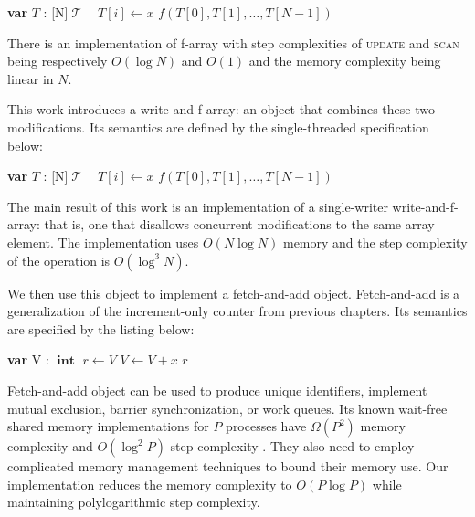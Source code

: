 \documentclass[a4paper,11pt]{article}
\def\T{\ensuremath{\operatorname{\mathcal{T}}}\text{ }}
\def\int{\ensuremath{\operatorname{\textbf{int}}}}
\newcommand{\fn}[1]{\textsc{#1}}
\newcommand{\var}[2]{\textbf{var }#1 : #2}
\newcommand{\arrayspec}[1]{\text{array}[#1]\text{ of }}
\begin{document}
\begin{algorithmic}[1]
	\State\var{$T$}{\arrayspec{N}$\T$}
	\State $T[i] \gets x$
\EndFunction
{}
	\State\Return $f(T[0], T[1], \ldots, T[N-1])$
\EndFunction
\end{algorithmic}

There is an implementation of f-array with step complexities of \fn{update} and \fn{scan} being respectively $O(\log N)$ and $O(1)$ and the memory complexity
being linear in $N$.

This work introduces a write-and-f-array: an object that combines these two modifications. Its semantics are defined by the single-threaded specification below:

\begin{algorithmic}[1]
	\State\var{$T$}{\arrayspec{N}$\T$}
		\State $T[i] \gets x$
		\State\Return $f(T[0], T[1], \ldots, T[N-1])$
	\EndFunction
\end{algorithmic}

The main result of this work is an implementation of a single-writer
write-and-f-array: that is, one that disallows concurrent modifications to the same array element. The implementation
uses $O(N\log{}N)$ memory and the step complexity of the operation is $O(\log^3N)$. 

We then use this object to implement a fetch-and-add object. Fetch-and-add is a generalization of the increment-only counter from previous chapters. Its semantics are specified by the listing below:

\begin{algorithmic}[1]
\State\var{V}{\int}
	\State $r \gets V$
	\State $V \gets V + x$
	\State\Return $r$
\EndFunction
\end{algorithmic}


Fetch-and-add object can be used to produce unique identifiers, implement
mutual exclusion, barrier synchronization\cite{faa-sync}, or work queues\cite{faa-queue}. Its known wait-free shared memory implementations for $P$ processes have $\Omega(P^2)$ memory complexity and $O(\log^2 P)$ step complexity
\cite{ellen-fai}\cite{closed-object}. They also need to employ complicated memory management techniques to bound their memory use. Our implementation reduces the memory complexity to $O(P\log P)$ while maintaining polylogarithmic step complexity.
\end{document}
